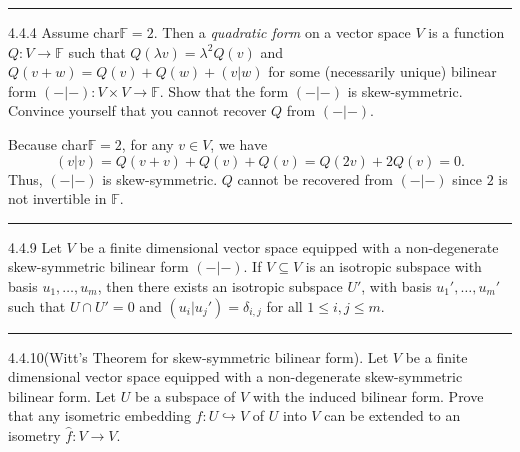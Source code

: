 \documentclass[a4paper, 12pt]{article}
\begin{document}
\noindent\rule{7in}{2.8pt}

\begin{problem}{4.4.4}
Assume char\(\mathbb{F}=2\). Then a \textit{quadratic form} on a vector space \(V\) is a function \(Q:V\rightarrow \mathbb{F}\) such that \(Q(\lambda v)=\lambda^2 Q(v)\) and \(Q(v+w)=Q(v)+Q(w)+(v|w)\) for some 
(necessarily unique) bilinear form \((-|-):V\times V\rightarrow \mathbb{F}\). Show that the form \((-|-)\) is skew-symmetric. Convince yourself that you cannot recover \(Q\) from \((-|-)\).
\end{problem}
\begin{solution}
Because char\(\mathbb{F}=2\), for any \(v\in V\), we have 
\[(v|v)=Q(v+v)+Q(v)+Q(v)=Q(2v)+2Q(v)=0.\]
Thus, \((-|-)\) is skew-symmetric. \(Q\) cannot be recovered from \((-|-)\) since \(2\) is not invertible in \(\mathbb{F}\).
\end{solution}

\noindent\rule{7in}{2.8pt}
\begin{problem}{4.4.9}
Let \(V\) be a finite dimensional vector space equipped with a non-degenerate skew-symmetric bilinear form \((-|-)\). If \(V\subseteq V\) is an isotropic subspace with 
basis \(u_1,\ldots,u_m\), then there exists an isotropic subspace \(U'\), with basis \(u_1',\ldots,u_m'\) such that \(U\cap U'=0\) and \((u_i|u_j')=\delta_{i,j}\) for all \(1\leq i,j\leq m\).
\end{problem}
\begin{solution}
	
\end{solution}

\noindent\rule{7in}{2.8pt}


\begin{problem}{4.4.10(Witt's Theorem for skew-symmetric bilinear form).}
Let \(V\) be a finite dimensional vector space equipped with a non-degenerate skew-symmetric bilinear form. Let \(U\) be a subspace of \(V\) with the induced bilinear form. Prove that any isometric embedding 
\(f:U\hookrightarrow V\) of \(U\) into \(V\) can be extended to an isometry \(\hat{f}:V\rightarrow V\).
\end{problem}
\begin{solution}
	
\end{solution}
\end{document}
